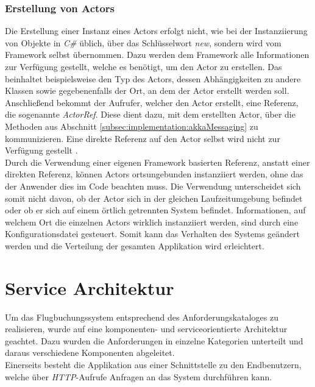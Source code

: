 \subsubsection{Erstellung von Actors}
\label{subsec:implementation:actorCreation}
Die Erstellung einer Instanz eines Actors erfolgt nicht, wie bei der Instanziierung von Objekte in \textit{C\#} üblich, über das Schlüsselwort \textit{new}, sondern wird vom Framework selbst übernommen. Dazu werden dem Framework alle Informationen zur Verfügung gestellt, welche es benötigt, um den Actor zu erstellen. Das beinhaltet beispielsweise den Typ des Actors, dessen Abhängigkeiten zu andere Klassen sowie gegebenenfalls der Ort, an dem der Actor erstellt werden soll. Anschließend bekommt der Aufrufer, welcher den Actor erstellt, eine Referenz, die sogenannte \textit{ActorRef}. Diese dient dazu, mit dem erstellten Actor, über die Methoden aus Abschnitt \ref{subsec:implementation:akkaMessaging} zu kommunizieren. Eine direkte Referenz auf den Actor selbst wird nicht zur Verfügung gestellt \citep{Akka.netCommunityAkka.NETDocumentation}. \\
Durch die Verwendung einer eigenen Framework basierten Referenz, anstatt einer direkten Referenz, können Actors ortsungebunden instanziiert werden, ohne das der Anwender dies im Code beachten muss. Die Verwendung unterscheidet sich somit nicht davon, ob der Actor sich in der gleichen Laufzeitumgebung befindet oder ob er sich auf einem örtlich getrennten System befindet. Informationen, auf welchem Ort die einzelnen Actors wirklich instanziiert werden, sind durch eine Konfigurationsdatei gesteuert. Somit kann das Verhalten des Systems geändert werden und die Verteilung der gesamten Applikation wird erleichtert.

\section{Service Architektur}
\label{sec:implementation:serviceAndComponentOrientation}
Um das Flugbuchungssystem entsprechend des Anforderungskataloges zu realisieren, wurde auf eine komponenten- und serviceorientierte Architektur geachtet. Dazu wurden die Anforderungen in einzelne Kategorien unterteilt und daraus verschiedene Komponenten abgeleitet. \\
Einerseits besteht die Applikation aus einer Schnittstelle zu den Endbenutzern, welche über \textit{HTTP}-Aufrufe Anfragen an das System durchführen kann. 

